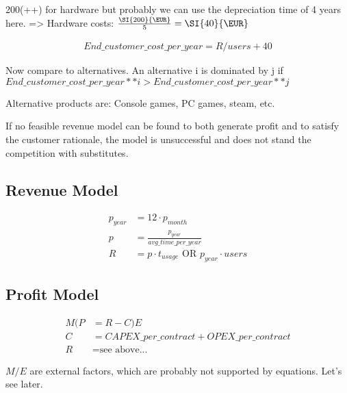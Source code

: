 200(++) for hardware but probably we can use the depreciation time of 4 years here. 
=> Hardware costs: $ \frac{\SI{200}{\EUR}}{5}  = \SI{40}{\EUR}$

\begin{align}
End\_customer\_cost\_per\_year = R/users + 40
\end{align}

Now compare to alternatives. An alternative i is dominated by j if $End\_customer\_cost\_per\_year ** i > End\_customer\_cost\_per\_year ** j$

Alternative products are: Console games, PC games, steam, etc.

If no feasible revenue model can be found to both generate profit and to satisfy the customer rationale, the model is unsuccessful and does not stand the competition with substitutes.



\subsection{Revenue Model}

\begin{align*}
p_{year} &= 12 \cdot p_{month} \\
p &= \frac{p_{year}}{avg\_time\_per\_year} \\
R &= p  \cdot t_{usage} \text{ OR } p_{year} \cdot users
\end{align*}


\subsection{Profit Model}

\begin{align*}
M(P & =R-C)E \\
C &= CAPEX\_per\_contract + OPEX\_per\_contract \\
R &= \text{see above...}
\end{align*}

$M / E$ are external factors, which are probably not supported by equations. Let's see later.

